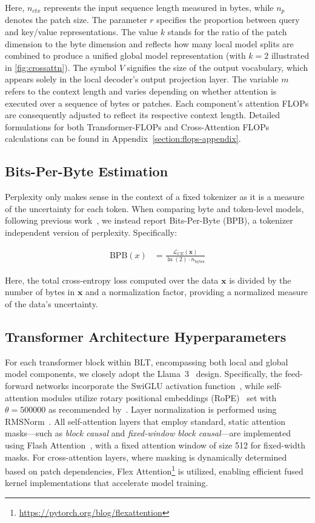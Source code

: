 Here, $n_{ctx}$ represents the input sequence length measured in bytes, while $n_p$ denotes the patch size. The parameter $r$ specifies the proportion between query and key/value representations. The value $k$ stands for the ratio of the patch dimension to the byte dimension and reflects how many local model splits are combined to produce a unified global model representation (with $k=2$ illustrated in \autoref{fig:crossattn}). The symbol $V$ signifies the size of the output vocabulary, which appears solely in the local decoder’s output projection layer. The variable $m$ refers to the context length and varies depending on whether attention is executed over a sequence of bytes or patches. Each component’s attention FLOPs are consequently adjusted to reflect its respective context length. Detailed formulations for both Transformer-FLOPs and Cross-Attention FLOPs calculations can be found in Appendix~\ref{section:flops-appendix}.

\subsection{Bits-Per-Byte Estimation} Perplexity only makes sense in the context of a fixed tokenizer as it is a measure of the uncertainty for each token. When comparing byte and token-level models, following previous work~\citep{xue2022byt5, yu2023megabyte, wang2024mambabyte}, we instead report Bits-Per-Byte (BPB), a tokenizer independent version of perplexity. Specifically:

\begin{align}
    \text{BPB}(x)&= \frac{\mathcal{L}_{CE}(\pmb{x})}{\ln(2)\cdot n_{\text{bytes}}}
\end{align}

Here, the total cross-entropy loss computed over the data $\pmb{x}$ is divided by the number of bytes in $\pmb{x}$ and a normalization factor, providing a normalized measure of the data’s uncertainty.

\subsection{Transformer Architecture Hyperparameters} 

For each transformer block within {\textsc BLT}, encompassing both local and global model components, we closely adopt the Llama~3~\citep{dubey2024llama} design. Specifically, the feed-forward networks incorporate the SwiGLU activation function~\citep{swiglu}, while self-attention modules utilize rotary positional embeddings (RoPE)~\citep{RoPe} set with $\theta=500000$ as recommended by~\citep{xiong2024effective}. Layer normalization is performed using RMSNorm~\citep{RMSNorm}. All self-attention layers that employ standard, static attention masks—such as \textit{block causal} and \textit{fixed-window block causal}—are implemented using Flash Attention~\citep{dao2022flashattention}, with a fixed attention window of size 512 for fixed-width masks. For cross-attention layers, where masking is dynamically determined based on patch dependencies, Flex Attention\footnote{\url{https://pytorch.org/blog/flexattention}} is utilized, enabling efficient fused kernel implementations that accelerate model training.

